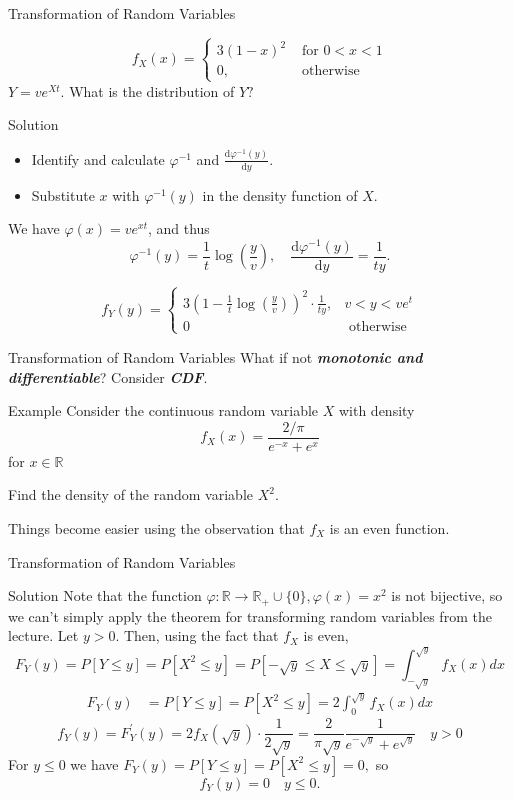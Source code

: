 \documentclass{beamer}
\newcommand{\bb}[1]{\textcolor{antiquefuchsia}{\textbf{\textit{#1}}}}
\begin{document}
\begin{frame}{Transformation of Random Variables}

$$
f_{X}(x)= \begin{cases}3(1-x)^{2} & \text { for } 0<x<1 \\ 0, & \text { otherwise }\end{cases}
$$
$Y=v e^{X t}$. What is the distribution of $Y ?$

\begin{block}{Solution}
\begin{itemize}
\item Identify and calculate $\varphi^{-1}$ and $\frac{\mathrm{d} \varphi^{-1}(y)}{\mathrm{d} y}$.
\item Substitute $x$ with $\varphi^{-1}(y)$ in the density function of $X$.
\end{itemize}
We have $\varphi(x)=v e^{x t}$, and thus
$$
\varphi^{-1}(y)=\frac{1}{t} \log \left(\frac{y}{v}\right), \quad \frac{\mathrm{d} \varphi^{-1}(y)}{\mathrm{d} y}=\frac{1}{t y} .
$$

$$
f_{Y}(y)= \begin{cases}3\left(1-\frac{1}{t} \log \left(\frac{y}{v}\right)\right)^{2} \cdot \frac{1}{t y}, & v<y<v e^{t} \\ 0 & \text { otherwise }\end{cases}
$$
\end{block}
\end{frame}


\begin{frame}{Transformation of Random Variables}
What if not \bb{monotonic and differentiable}? Consider \bb{CDF}.
\begin{block}{Example}
Consider the continuous random variable $X$ with density
$$
f_{X}(x)=\frac{2/\pi}{e^{-x}+e^{x}}
$$
for $x \in \mathbb{R}$

Find the density of the random variable $X^{2}$.
\end{block}
Things become easier using the observation that $f_X$ is an even function.
\end{frame}

\begin{frame}{Transformation of Random Variables}
\begin{block}{Solution}
Note that the function $\varphi: \mathbb{R} \rightarrow \mathbb{R}_{+} \cup\{0\}, \varphi(x)=x^{2}$ is not bijective, so we can't simply apply the theorem for transforming random variables from the lecture. Let $y>0$. Then, using the fact that $f_{X}$ is even,
$$
F_{Y}(y)=P[Y \leq y]=P\left[X^{2} \leq y\right]=P[-\sqrt{y} \leq X \leq \sqrt{y}]=\int_{-\sqrt{y}}^{\sqrt{y}} f_{X}(x) d x
$$
$$
\begin{aligned}
F_{Y}(y) &=P[Y \leq y]=P\left[X^{2} \leq y\right]=2 \int_{0}^{\sqrt{y}} f_{X}(x) d x
\end{aligned}
$$
$$
f_{Y}(y)=F_{Y}^{\prime}(y)=2 f_{X}(\sqrt{y}) \cdot \frac{1}{2 \sqrt{y}}=\frac{2}{\pi \sqrt{y}} \frac{1}{e^{-\sqrt{y}}+e^{\sqrt{y}}}\quad  y>0
$$
For $y \leq 0$ we have
$
F_{Y}(y)=P[Y \leq y]=P\left[X^{2} \leq y\right]=0,
$
so $$f_{Y}(y)=0 \quad y \leq 0 .$$
\end{block}
\end{frame}
\end{document}

